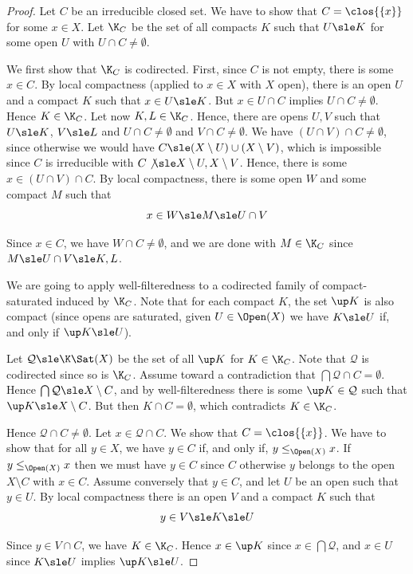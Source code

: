 \begin{proof}
Let $C$ be an irreducible closed set.
We have to show that $C = \clos{\{x\}}$ for some $x \in X$.
%
Let $\K_C$ be the set of all compacts $K$ such that $U \sle K$
for some open $U$ with $U \cap C \neq \emptyset$.

We first show that $\K_C$ is codirected.
First, since $C$ is not empty, there is some $x \in C$.
By local compactness (applied to $x \in X$ with $X$ open),
there is an open $U$ and a compact $K$ such that $x \in U \sle K$.
But $x \in U \cap C$ implies $U \cap C \neq \emptyset$.
Hence $K \in \K_C$.
Let now $K, L \in \K_C$.
Hence, there are opens $U, V$ such that
$U \sle K$, $V \sle L$
and $U \cap C \neq \emptyset$
and $V \cap C \neq \emptyset$.
We have $(U \cap V) \cap C \neq \emptyset$,
since otherwise we would have $C \sle (X \setminus U) \cup (X \setminus V)$,
which is impossible since $C$ is irreducible
with $C \not\sle X \setminus U, X \setminus V$.
Hence, there is some $x \in (U \cap V) \cap C$.
By local compactness, there is some open $W$ and some compact $M$
such that
\[
  x \in W \sle M \sle U \cap V
\]

\noindent
Since $x \in C$, we have $W \cap C \neq \emptyset$,
and we are done with $M \in \K_C$ since $M \sle U \cap V \sle K, L$.

We are going to apply well-filteredness to a codirected
family of compact-saturated induced by $\K_C$.
Note that for each compact $K$, the set $\up K$ is also compact
(since opens are saturated, given $U \in \Open(X)$ we have
$K \sle U$ if, and only if $\up K \sle U$).

Let $\mathcal{Q} \sle \K\Sat(X)$ be the set of all $\up K$ for $K \in \K_C$.
Note that $\mathcal{Q}$ is codirected since so is $\K_C$.
Assume toward a contradiction that $\bigcap \mathcal{Q} \cap C = \emptyset$.
Hence $\bigcap \mathcal{Q} \sle X \setminus C$,
and by well-filteredness there is some $\up K \in \mathcal{Q}$
such that $\up K \sle X \setminus C$.
But then $K \cap C = \emptyset$,
which contradicts $K \in \K_C$.

Hence $\mathcal{Q} \cap C \neq \emptyset$.
Let $x \in \mathcal{Q} \cap C$.
We show that $C = \clos{\{x\}}$.
We have to show that for all $y \in X$,
we have $y \in C$ if, and only if, $y \leq_{\Open(X)} x$.
If $y \leq_{\Open(X)} x$ then
we must have $y \in C$ since $C$ 
otherwise $y$ belongs to the open $X \setminus C$ with $x \in C$.
Assume conversely that $y \in C$,
and let $U$ be an open such that $y \in U$.
By local compactness there is an open $V$ and a compact $K$ such that
\[
  y \in V \sle K \sle U
\]

\noindent
Since $y \in V \cap C$, we have $K \in \K_C$.
Hence $x \in \up K$ since $x \in \bigcap \mathcal{Q}$,
and $x \in U$ since $K \sle U$ implies $\up K \sle U$.
\end{proof}

